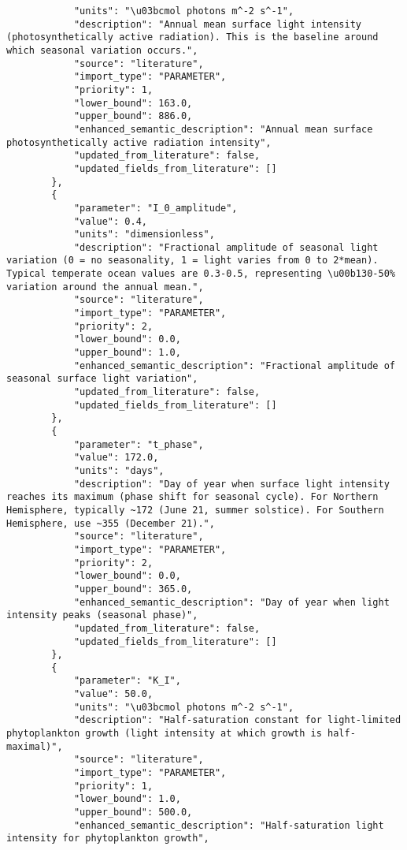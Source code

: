 \begin{lstlisting}
            "units": "\u03bcmol photons m^-2 s^-1",
            "description": "Annual mean surface light intensity (photosynthetically active radiation). This is the baseline around which seasonal variation occurs.",
            "source": "literature",
            "import_type": "PARAMETER",
            "priority": 1,
            "lower_bound": 163.0,
            "upper_bound": 886.0,
            "enhanced_semantic_description": "Annual mean surface photosynthetically active radiation intensity",
            "updated_from_literature": false,
            "updated_fields_from_literature": []
        },
        {
            "parameter": "I_0_amplitude",
            "value": 0.4,
            "units": "dimensionless",
            "description": "Fractional amplitude of seasonal light variation (0 = no seasonality, 1 = light varies from 0 to 2*mean). Typical temperate ocean values are 0.3-0.5, representing \u00b130-50% variation around the annual mean.",
            "source": "literature",
            "import_type": "PARAMETER",
            "priority": 2,
            "lower_bound": 0.0,
            "upper_bound": 1.0,
            "enhanced_semantic_description": "Fractional amplitude of seasonal surface light variation",
            "updated_from_literature": false,
            "updated_fields_from_literature": []
        },
        {
            "parameter": "t_phase",
            "value": 172.0,
            "units": "days",
            "description": "Day of year when surface light intensity reaches its maximum (phase shift for seasonal cycle). For Northern Hemisphere, typically ~172 (June 21, summer solstice). For Southern Hemisphere, use ~355 (December 21).",
            "source": "literature",
            "import_type": "PARAMETER",
            "priority": 2,
            "lower_bound": 0.0,
            "upper_bound": 365.0,
            "enhanced_semantic_description": "Day of year when light intensity peaks (seasonal phase)",
            "updated_from_literature": false,
            "updated_fields_from_literature": []
        },
        {
            "parameter": "K_I",
            "value": 50.0,
            "units": "\u03bcmol photons m^-2 s^-1",
            "description": "Half-saturation constant for light-limited phytoplankton growth (light intensity at which growth is half-maximal)",
            "source": "literature",
            "import_type": "PARAMETER",
            "priority": 1,
            "lower_bound": 1.0,
            "upper_bound": 500.0,
            "enhanced_semantic_description": "Half-saturation light intensity for phytoplankton growth",

\end{lstlisting}
